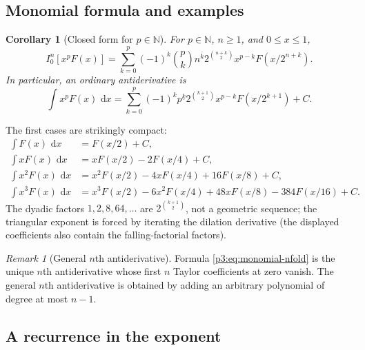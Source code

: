 \documentclass[11pt,oneside]{article}
\newtheorem{corollary}[theorem]{Corollary}
\theoremstyle{definition}
\theoremstyle{remark}
\newtheorem{remark}[theorem]{Remark}
\newcommand{\N}{\mathbb N}
\newcommand{\dd}{\,\mathrm d}
\newcommand{\fall}[2]{#1^{\underline{#2}}}
\newcommand{\rise}[2]{#1^{\overline{#2}}}
\newcommand{\1}{\mathbf 1}
\begin{document}
\subsection{Monomial formula and examples}

\begin{corollary}[Closed form for $p\in\N$]
\label{p3:cor:monomial}
For $p\in\N$, $n\ge1$, and $0\le x\le1$,
\begin{equation}
 \boxed{
 I_0^n[x^pF(x)]
 =\sum_{k=0}^{p}(-1)^k\binom pk\rise nk
 2^{\binom{n+k}{2}}x^{p-k}F(x/2^{n+k}).}
 \label{p3:eq:monomial-nfold}
\end{equation}
In particular, an ordinary antiderivative is
\begin{equation}
 \boxed{
 \int x^pF(x)\,\dd x
 =\sum_{k=0}^{p}(-1)^k\fall pk
 2^{\binom{k+1}{2}}x^{p-k}F(x/2^{k+1})+C.}
 \label{p3:eq:monomial-antiderivative}
\end{equation}
\end{corollary}

The first cases are strikingly compact:
\begin{align}
 \int F(x)\,\dd x
 &=F(x/2)+C,                                                   \label{p3:eq:example-p0}\\
 \int xF(x)\,\dd x
 &=xF(x/2)-2F(x/4)+C,                                         \label{p3:eq:example-p1}\\
 \int x^2F(x)\,\dd x
 &=x^2F(x/2)-4xF(x/4)+16F(x/8)+C,                             \label{p3:eq:example-p2}\\
 \int x^3F(x)\,\dd x
 &=x^3F(x/2)-6x^2F(x/4)+48xF(x/8)-384F(x/16)+C.               \label{p3:eq:example-p3}
\end{align}
The dyadic factors $1,2,8,64,\ldots$ are $2^{\binom{k+1}{2}}$, not a geometric sequence;
the triangular exponent is forced by iterating the dilation derivative (the displayed
coefficients also contain the falling-factorial factors).

\begin{remark}[General $n$th antiderivative]
Formula \eqref{p3:eq:monomial-nfold} is the unique $n$th antiderivative whose first $n$ Taylor
coefficients at zero vanish.  The general $n$th antiderivative is obtained by adding an
arbitrary polynomial of degree at most $n-1$.
\end{remark}

\subsection{A recurrence in the exponent}
\end{document}
